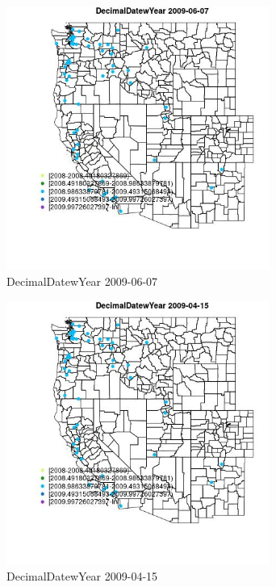 \begin{figure} 
\centering  
\includegraphics[width=0.77\textwidth]{Code_Outputs/Report_ML_input_PM25_Step4_part_e_de_duplicated_aves_MapObsDecimalDatewYear2009-06-07.jpg} 
\caption{\label{fig:Report_ML_input_PM25_Step4_part_e_de_duplicated_avesMapObsDecimalDatewYear2009-06-07}DecimalDatewYear 2009-06-07} 
\end{figure} 
 

\clearpage 

\begin{figure} 
\centering  
\includegraphics[width=0.77\textwidth]{Code_Outputs/Report_ML_input_PM25_Step4_part_e_de_duplicated_aves_MapObsDecimalDatewYear2009-04-15.jpg} 
\caption{\label{fig:Report_ML_input_PM25_Step4_part_e_de_duplicated_avesMapObsDecimalDatewYear2009-04-15}DecimalDatewYear 2009-04-15} 
\end{figure} 
 

